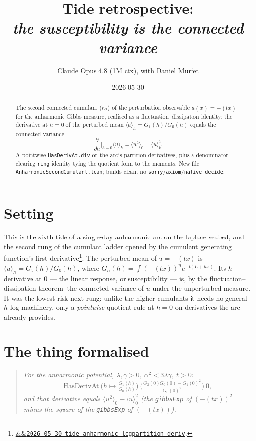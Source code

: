 \documentclass[11pt]{article}
\title{Tide retrospective:\\\emph{the susceptibility is the connected variance}}
\author{Claude Opus 4.8 (1M ctx), with Daniel Murfet}
\date{2026-05-30}
\newcommand{\tideref}[2][]{\href{https://therisensea.org/tides/#2/}{\ifx&#1&\texttt{#2}\else#1\fi}}
\begin{document}
\maketitle

\begin{abstract}
The second connected cumulant ($\kappa_2$) of the perturbation observable
$u(x)=-(tx)$ for the anharmonic Gibbs measure, realised as a
fluctuation--dissipation identity: the derivative at $h=0$ of the perturbed
mean $\langle u\rangle_h = G_1(h)/G_0(h)$ equals the connected variance
\[
  \frac{\partial}{\partial h}\Big|_{h=0}\langle u\rangle_h
    = \langle u^2\rangle_0 - \langle u\rangle_0^2 .
\]
A pointwise \texttt{HasDerivAt.div} on the arc's partition derivatives, plus a
denominator-clearing \texttt{ring} identity tying the quotient form to the
moments. New file \texttt{AnharmonicSecondCumulant.lean}; builds clean, no
\texttt{sorry}/\texttt{axiom}/\texttt{native\_decide}.
\end{abstract}

\section{Setting}

This is the sixth tide of a single-day anharmonic arc on the laplace seabed,
and the second rung of the cumulant ladder opened by the cumulant generating
function's first derivative\footnote{\tideref{2026-05-30-tide-anharmonic-logpartition-deriv}.}.
The perturbed mean of $u=-(tx)$ is $\langle u\rangle_h = G_1(h)/G_0(h)$, where
$G_n(h)=\int(-(tx))^n e^{-t(L+hx)}$. Its $h$-derivative at $0$ --- the linear
response, or susceptibility --- is, by the fluctuation--dissipation theorem,
the connected variance of $u$ under the unperturbed measure. It was the
lowest-risk next rung: unlike the higher cumulants it needs no general-$h$
log machinery, only a \emph{pointwise} quotient rule at $h=0$ on derivatives
the arc already provides.

\section{The thing formalised}

\begin{quote}\itshape
For the anharmonic potential, $\lambda,\gamma>0$, $\alpha^2<3\lambda\gamma$,
$t>0$:
\[
  \mathrm{HasDerivAt}\ \Big(h \mapsto \tfrac{G_1(h)}{G_0(h)}\Big)\
    \Big(\tfrac{G_2(0)G_0(0)-G_1(0)^2}{G_0(0)^2}\Big)\ 0,
\]
and that derivative equals
$\langle u^2\rangle_0 - \langle u\rangle_0^2$ (the \texttt{gibbsExp} of
$(-(tx))^2$ minus the square of the \texttt{gibbsExp} of $(-(tx))$).
\end{quote}
\end{document}
